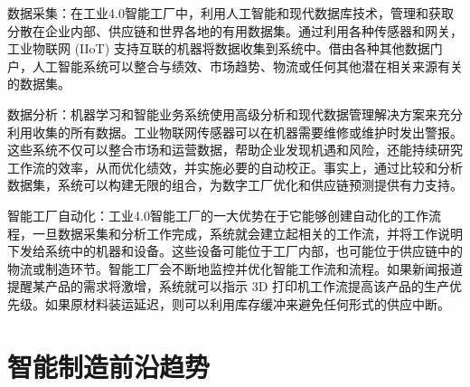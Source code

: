 \documentclass[lang=cn,12pt,bibtex,newtx,twoside,margintrue,citestyle=gb7714-2015, bibstyle=gb7714-2015]{elegantbook}
\begin{document}
数据采集：在工业4.0智能工厂中，利用人工智能和现代数据库技术，管理和获取分散在企业内部、供应链和世界各地的有用数据集。通过利用各种传感器和网关，工业物联网 (IIoT) 支持互联的机器将数据收集到系统中。借由各种其他数据门户，人工智能系统可以整合与绩效、市场趋势、物流或任何其他潜在相关来源有关的数据集。

数据分析：机器学习和智能业务系统使用高级分析和现代数据管理解决方案来充分利用收集的所有数据。工业物联网传感器可以在机器需要维修或维护时发出警报。这些系统不仅可以整合市场和运营数据，帮助企业发现机遇和风险，还能持续研究工作流的效率，从而优化绩效，并实施必要的自动校正。事实上，通过比较和分析数据集，系统可以构建无限的组合，为数字工厂优化和供应链预测提供有力支持。

智能工厂自动化：工业4.0智能工厂的一大优势在于它能够创建自动化的工作流程，一旦数据采集和分析工作完成，系统就会建立起相关的工作流，并将工作说明下发给系统中的机器和设备。这些设备可能位于工厂内部，也可能位于供应链中的物流或制造环节。智能工厂会不断地监控并优化智能工作流和流程。如果新闻报道提醒某产品的需求将激增，系统就可以指示 3D 打印机工作流提高该产品的生产优先级。如果原材料装运延迟，则可以利用库存缓冲来避免任何形式的供应中断。

\section{智能制造前沿趋势}
\label{sec:orgfbc659a}
\end{document}
